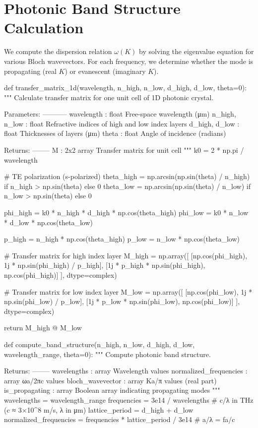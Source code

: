 \documentclass[11pt,a4paper]{article}
\begin{document}
\section{Photonic Band Structure Calculation}

We compute the dispersion relation $\omega(K)$ by solving the eigenvalue equation for various Bloch wavevectors. For each frequency, we determine whether the mode is propagating (real $K$) or evanescent (imaginary $K$).

\begin{pycode}
def transfer_matrix_1d(wavelength, n_high, n_low, d_high, d_low, theta=0):
    """
    Calculate transfer matrix for one unit cell of 1D photonic crystal.

    Parameters:
    -----------
    wavelength : float
        Free-space wavelength (μm)
    n_high, n_low : float
        Refractive indices of high and low index layers
    d_high, d_low : float
        Thicknesses of layers (μm)
    theta : float
        Angle of incidence (radians)

    Returns:
    --------
    M : 2x2 array
        Transfer matrix for unit cell
    """
    k0 = 2 * np.pi / wavelength

    # TE polarization (s-polarized)
    theta_high = np.arcsin(np.sin(theta) / n_high) if n_high > np.sin(theta) else 0
    theta_low = np.arcsin(np.sin(theta) / n_low) if n_low > np.sin(theta) else 0

    phi_high = k0 * n_high * d_high * np.cos(theta_high)
    phi_low = k0 * n_low * d_low * np.cos(theta_low)

    p_high = n_high * np.cos(theta_high)
    p_low = n_low * np.cos(theta_low)

    # Transfer matrix for high index layer
    M_high = np.array([
        [np.cos(phi_high), 1j * np.sin(phi_high) / p_high],
        [1j * p_high * np.sin(phi_high), np.cos(phi_high)]
    ], dtype=complex)

    # Transfer matrix for low index layer
    M_low = np.array([
        [np.cos(phi_low), 1j * np.sin(phi_low) / p_low],
        [1j * p_low * np.sin(phi_low), np.cos(phi_low)]
    ], dtype=complex)

    return M_high @ M_low

def compute_band_structure(n_high, n_low, d_high, d_low, wavelength_range, theta=0):
    """
    Compute photonic band structure.

    Returns:
    --------
    wavelengths : array
        Wavelength values
    normalized_frequencies : array
        ωa/2πc values
    bloch_wavevector : array
        Ka/π values (real part)
    is_propagating : array
        Boolean array indicating propagating modes
    """
    wavelengths = wavelength_range
    frequencies = 3e14 / wavelengths  # c/λ in THz (c ≈ 3×10^8 m/s, λ in μm)
    lattice_period = d_high + d_low
    normalized_frequencies = frequencies * lattice_period / 3e14  # a/λ = fa/c


\end{pycode}
\end{document}
